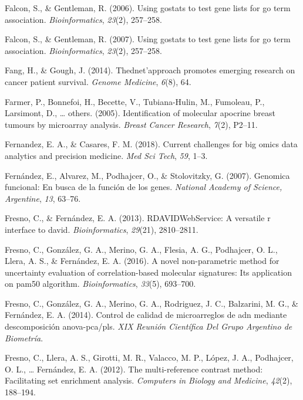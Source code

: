 \documentclass[12pt,twoside]{reedthesis}
\begin{document}
\leavevmode\hypertarget{ref-falcon2006using}{}%
Falcon, S., \& Gentleman, R. (2006). Using gostats to test gene lists for go term association. \emph{Bioinformatics}, \emph{23}(2), 257--258.

\leavevmode\hypertarget{ref-falcon2007using}{}%
Falcon, S., \& Gentleman, R. (2007). Using gostats to test gene lists for go term association. \emph{Bioinformatics}, \emph{23}(2), 257--258.

\leavevmode\hypertarget{ref-fang2014thednet}{}%
Fang, H., \& Gough, J. (2014). Thednet'approach promotes emerging research on cancer patient survival. \emph{Genome Medicine}, \emph{6}(8), 64.

\leavevmode\hypertarget{ref-farmer2005identification}{}%
Farmer, P., Bonnefoi, H., Becette, V., Tubiana-Hulin, M., Fumoleau, P., Larsimont, D., \ldots{} others. (2005). Identification of molecular apocrine breast tumours by microarray analysis. \emph{Breast Cancer Research}, \emph{7}(2), P2--11.

\leavevmode\hypertarget{ref-fernandez2018current}{}%
Fernandez, E. A., \& Casares, F. M. (2018). Current challenges for big omics data analytics and precision medicine. \emph{Med Sci Tech}, \emph{59}, 1--3.

\leavevmode\hypertarget{ref-fernandez2007genomica}{}%
Fernández, E., Alvarez, M., Podhajcer, O., \& Stolovitzky, G. (2007). Genomica funcional: En busca de la función de los genes. \emph{National Academy of Science, Argentine}, \emph{13}, 63--76.

\leavevmode\hypertarget{ref-fresno2013rdavidwebservice}{}%
Fresno, C., \& Fernández, E. A. (2013). RDAVIDWebService: A versatile r interface to david. \emph{Bioinformatics}, \emph{29}(21), 2810--2811.

\leavevmode\hypertarget{ref-fresno2016novel}{}%
Fresno, C., González, G. A., Merino, G. A., Flesia, A. G., Podhajcer, O. L., Llera, A. S., \& Fernández, E. A. (2016). A novel non-parametric method for uncertainty evaluation of correlation-based molecular signatures: Its application on pam50 algorithm. \emph{Bioinformatics}, \emph{33}(5), 693--700.

\leavevmode\hypertarget{ref-fresnocontrol}{}%
Fresno, C., González, G. A., Merino, G. A., Rodriguez, J. C., Balzarini, M. G., \& Fernández, E. A. (2014). Control de calidad de microarreglos de adn mediante descomposición anova-pca/pls. \emph{XIX Reunión Científica Del Grupo Argentino de Biometría}.

\leavevmode\hypertarget{ref-fresno2012multi}{}%
Fresno, C., Llera, A. S., Girotti, M. R., Valacco, M. P., López, J. A., Podhajcer, O. L., \ldots{} Fernández, E. A. (2012). The multi-reference contrast method: Facilitating set enrichment analysis. \emph{Computers in Biology and Medicine}, \emph{42}(2), 188--194.
\end{document}
